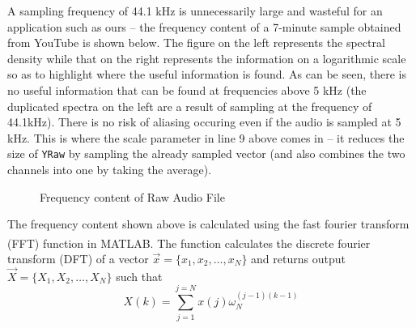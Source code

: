A sampling frequency of 44.1 kHz is unnecessarily large and wasteful for an application such as ours -- the frequency content of a 7-minute sample obtained from YouTube \cite{simplevideo} is shown below. The figure on the left represents the spectral density while that on the right represents the information on a logarithmic scale so as to highlight where the useful information is found. As can be seen, there is no useful information that can be found at frequencies above 5 kHz (the duplicated spectra on the left are a result of sampling at the frequency of 44.1kHz). There is no risk of aliasing occuring even if the audio is sampled at 5 kHz. This is where the scale parameter in line 9 above comes in -- it reduces the size of \verb!YRaw! by sampling the already sampled vector (and also combines the two channels into one by taking the average). 

\begin{figure}[htb]
	\centering
	\caption{Frequency content of Raw Audio File}
	\label{fig:simpleRawFreqContent}
\end{figure}

The frequency content shown above is calculated using the fast fourier transform (FFT) function in MATLAB\textsuperscript{\textregistered{}}. The function calculates the discrete fourier transform (DFT) of a vector $\vec x = \{x_1, x_2, \dotsc, x_{N}\}$ and returns output $\vec X = \{X_1, X_2, \dotsc, X_{N}\}$  such that
\begin{equation}
X(k) = \sum_{j=1}^{j=N}x(j)\omega^{(j-1)(k-1)}_N
\end{equation}

